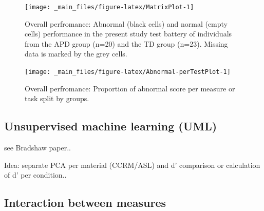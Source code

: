 \documentclass[a4paper, twoside]{templates/ociamthesis}
\begin{document}
\begin{figure}

{\centering \texttt{[image: \_main\_files/figure-latex/MatrixPlot-1]} 

}

\caption{Overall perfromance: Abnormal (black cells) and normal (empty cells) performance in the present study test battery of individuals from the APD group (n=20) and the TD group (n=23). Missing data is marked by the grey cells.}\label{fig:MatrixPlot}
\end{figure}

\begin{figure}

{\centering \texttt{[image: \_main\_files/figure-latex/Abnormal-perTestPlot-1]} 

}

\caption{Overall perfromance: Proportion of abnormal score per measure or task split by groups.}\label{fig:Abnormal-perTestPlot}
\end{figure}

\hypertarget{unsupervised-machine-learning-uml}{%
\subsection{Unsupervised machine learning (UML)}\label{unsupervised-machine-learning-uml}}

see Bradshaw paper..

Idea: separate PCA per material (CCRM/ASL) and d' comparison or calculation of d' per condition..

\hypertarget{interaction-between-measures}{%
\subsection{Interaction between measures}\label{interaction-between-measures}}
\end{document}
